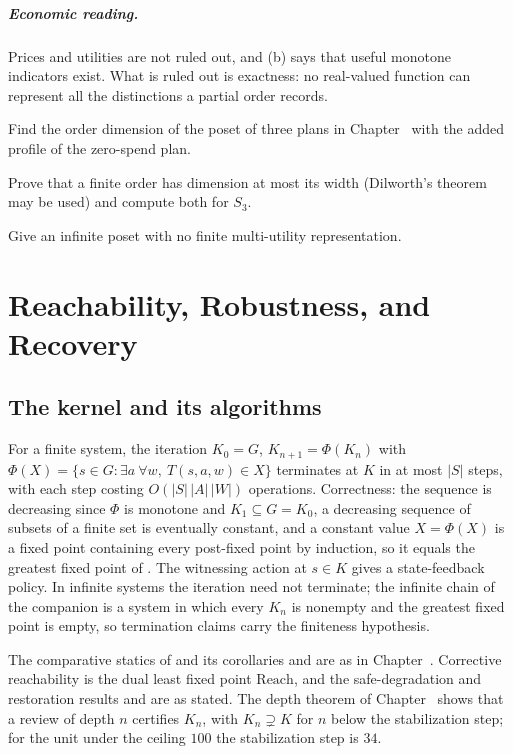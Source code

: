 \paragraph{Economic reading.} Prices and utilities are not ruled out, and (b) says that useful monotone indicators exist. What is ruled out is exactness: no real-valued function can represent all the distinctions a partial order records.

\begin{exercise}
Find the order dimension of the poset of three plans in Chapter~ with the added profile of the zero-spend plan.
\end{exercise}
\begin{exercise}
Prove that a finite order has dimension at most its width (Dilworth's theorem may be used) and compute both for $S_3$.
\end{exercise}
\begin{exercise}
Give an infinite poset with no finite multi-utility representation.
\end{exercise}

\chapter{Reachability, Robustness, and Recovery}\label{ch:43}

\section{The kernel and its algorithms}

For a finite system, the iteration $K_0=G$, $K_{n+1}=\Phi(K_n)$ with $\Phi(X)=\{s\in G:\exists a\ \forall w,\ T(s,a,w)\in X\}$ terminates at $K$ in at most $|S|$ steps, with each step costing $O(|S|\,|A|\,|W|)$ operations. Correctness: the sequence is decreasing since $\Phi$ is monotone and $K_1\subseteq G=K_0$, a decreasing sequence of subsets of a finite set is eventually constant, and a constant value $X=\Phi(X)$ is a fixed point containing every post-fixed point by induction, so it equals the greatest fixed point of . The witnessing action at $s\in K$ gives a state-feedback policy. In infinite systems the iteration need not terminate; the infinite chain of the companion is a system in which every $K_n$ is nonempty and the greatest fixed point is empty, so termination claims carry the finiteness hypothesis.

The comparative statics of  and its corollaries  and  are as in Chapter~. Corrective reachability  is the dual least fixed point $\mathrm{Reach}$, and the safe-degradation and restoration results  and  are as stated. The depth theorem of Chapter~ shows that a review of depth $n$ certifies $K_n$, with $K_n\supsetneq K$ for $n$ below the stabilization step; for the unit under the ceiling $100$ the stabilization step is $34$.

